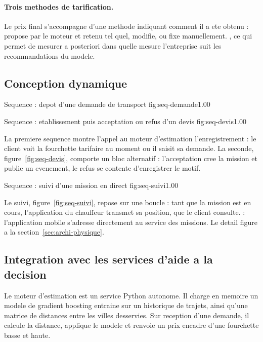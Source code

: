 \paragraph{Trois methodes de tarification.}
Le prix final s'accompagne d'une methode indiquant comment il a ete
obtenu : propose par le moteur et retenu tel quel, modifie, ou fixe
manuellement. , ce qui permet
de mesurer a posteriori dans quelle mesure l'entreprise suit les
recommandations du modele.

\subsection{Conception dynamique}

  {Sequence : depot d'une demande de transport}
  {fig:seq-demande}{1.00}

  {Sequence : etablissement puis acceptation ou refus d'un devis}
  {fig:seq-devis}{1.00}

La premiere sequence montre l'appel au moteur d'estimation 
l'enregistrement : le client voit la fourchette tarifaire au moment ou il
saisit sa demande. La seconde, figure~\ref{fig:seq-devis}, comporte un
bloc alternatif : l'acceptation cree la mission et publie un evenement,
le refus se contente d'enregistrer le motif.

  {Sequence : suivi d'une mission en direct}
  {fig:seq-suivi}{1.00}

Le suivi, figure~\ref{fig:seq-suivi}, repose sur une boucle : tant que la
mission est en cours, l'application du chauffeur transmet sa position, que
le client consulte.  : l'application mobile s'adresse directement au service des
missions. Le detail figure a la section~\ref{sec:archi-physique}.

\subsection{Integration avec les services d'aide a la decision}

Le moteur d'estimation est un service Python autonome. Il charge en
memoire un modele de gradient boosting entraine sur un historique de
trajets, ainsi qu'une matrice de distances entre les villes desservies.
Sur reception d'une demande, il calcule la distance, applique le modele et
renvoie un prix encadre d'une fourchette basse et haute.

